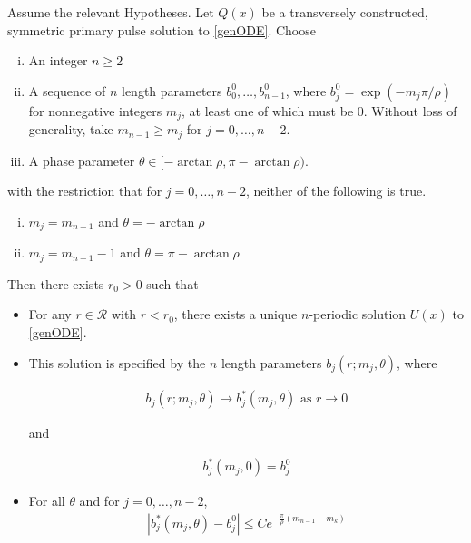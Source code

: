 \documentclass[thesis.tex]{subfiles}
\begin{document}
\begin{theorem}\label{perexist}
Assume the relevant Hypotheses. Let $Q(x)$ be a transversely constructed, symmetric primary pulse solution to \eqref{genODE}. Choose

\begin{enumerate}[(i)]
\item An integer $n \geq 2$ 
\item A sequence of $n$ length parameters $b_0^0, \dots, b_{n-1}^0$, where $b_j^0 = \exp(-m_j \pi / \rho )$ for nonnegative integers $m_j$, at least one of which must be 0. Without loss of generality, take $m_{n-1} \geq m_j$ for $j = 0, \dots, n-2$. 
\item A phase parameter $\theta \in [-\arctan \rho, \pi - \arctan \rho)$.
\end{enumerate}

with the restriction that for $j = 0, \dots, n-2$, neither of the following is true.

\begin{enumerate}[(i)]
\item $m_j = m_{n-1}$ and $\theta = -\arctan \rho$
\item $m_j = m_{n-1} - 1$ and $\theta = \pi-\arctan \rho$
\end{enumerate}

Then there exists $r_0 > 0$ such that

\begin{itemize}
\item For any $r \in \mathcal{R}$ with $r < r_0$, there exists a unique $n$-periodic solution $U(x)$ to \eqref{genODE}.

\item This solution is specified by the $n$ length parameters $b_j(r; m_j, \theta)$, where

\begin{align}
b_j(r; m_j, \theta) \rightarrow b^*_j(m_j, \theta) \text{ as } r \rightarrow 0
\end{align}

and

\begin{align}
b^*_j(m_j, 0) = b_j^0
\end{align}

\item For all $\theta$ and for $j = 0, \dots, n-2$,
\begin{align}
|b^*_j(m_j, \theta) - b_j^0| \leq C e^{ -\frac{\pi}{\rho} (m_{n-1} - m_k) }
\end{align}


\end{itemize}
\end{theorem}
\end{document}
